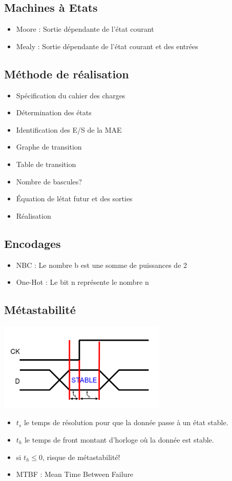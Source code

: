\documentclass[10pt]{article}
\begin{document}
\begin{multicols}{2}
  \section{Machines à Etats}
  \begin{itemize}
    \itemsep0em
    \item Moore : Sortie dépendante de l'état courant
    \item Mealy : Sortie dépendante de l'état courant et des entrées
  \end{itemize}
  \subsection{Méthode de réalisation}
  \begin{itemize}
    \itemsep0em
    \item Spécification du cahier des charges
    \item Détermination des états
    \item Identification des E/S de la MAE
    \item Graphe de transition
    \item Table de transition
    \item Nombre de bascules?
    \item Équation de létat futur et des sorties
    \item Réalisation
  \end{itemize}
  \subsection{Encodages}
  \begin{itemize}
    \itemsep0em
    \item NBC : Le nombre b est une somme de puissances de 2
    \item One-Hot : Le bit n représente le nombre n
  \end{itemize}
  \subsection{Métastabilité}
  \includegraphics[width=8cm]{./ts_th.png}
  \begin{itemize}
    \itemsep0em
    \item $t_s$ le temps de résolution pour que la donnée passe à un état
    stable.
    \item $t_h$ le temps de front montant d'horloge où la donnée est stable.
    \item si $t_h \leq 0$, risque de métastabilité!
    \item MTBF : Mean Time Between Failure
  \end{itemize}

\end{multicols}
\end{document}
